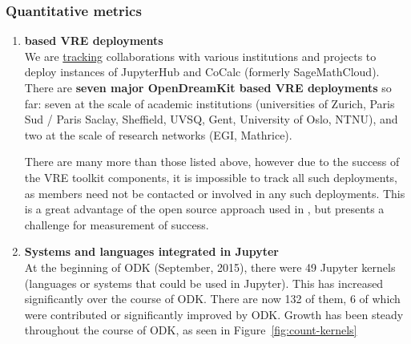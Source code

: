\subsubsection{Quantitative metrics}
\begin{enumerate}
\item \textbf{\ODK based VRE deployments}\\
  We are
  \href{https://github.com/OpenDreamKit/OpenDreamKit/issues/174}{tracking}
  collaborations with various institutions and projects to deploy
  instances of JupyterHub and CoCalc (formerly SageMathCloud). There
  are \textbf{seven major OpenDreamKit based VRE deployments} so far:
  seven at the scale of academic institutions (universities of Zurich,
  Paris Sud / Paris Saclay, Sheffield, UVSQ, Gent, University of Oslo, NTNU), and two at the
  scale of research networks (EGI, Mathrice).

  There are many more than those listed above,
  however due to the success of the VRE toolkit components,
  it is impossible to track all such deployments,
  as \ODK members need not be contacted or involved
  in any such deployments.
  This is a great advantage of the open source approach used in \ODK,
  but presents a challenge for measurement of success.

\item \textbf{Systems and languages integrated in Jupyter}\\
  At the beginning of ODK (September, 2015), there were 49 Jupyter kernels (languages or
  systems that could be used in Jupyter).
  This has increased significantly over the course of ODK. There are now 132 of them, 6
  of which were contributed or significantly improved by ODK.
  Growth has been steady throughout the course of ODK,
  as seen in Figure~\ref{fig:count-kernels}


\end{enumerate}
